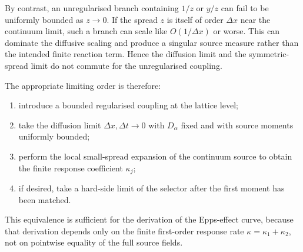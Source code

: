 \documentclass[5p,final]{elsarticle}
\begin{document}
By contrast, an unregularised branch containing $1/z$ or $y/z$ can fail to be uniformly bounded as $z\to0$.  If the spread $z$ is itself of order $\Delta x$ near the continuum limit, such a branch can scale like $O(1/\Delta x)$ or worse.  This can dominate the diffusive scaling and produce a singular source measure rather than the intended finite reaction term.  Hence the diffusion limit and the symmetric-spread limit do not commute for the unregularised coupling.

The appropriate limiting order is therefore:
\begin{enumerate}
\item introduce a bounded regularised coupling at the lattice level;
\item take the diffusion limit $\Delta x,\Delta t\to0$ with $D_\alpha$ fixed and with source moments uniformly bounded;
\item perform the local small-spread expansion of the continuum source to obtain the finite response coefficient $\kappa_j$;
\item if desired, take a hard-side limit of the selector after the first moment has been matched.
\end{enumerate}

This equivalence is sufficient for the derivation of the Epps-effect curve, because that derivation depends only on the finite first-order response rate $\kappa=\kappa_1+\kappa_2$, not on pointwise equality of the full source fields.
\end{document}
